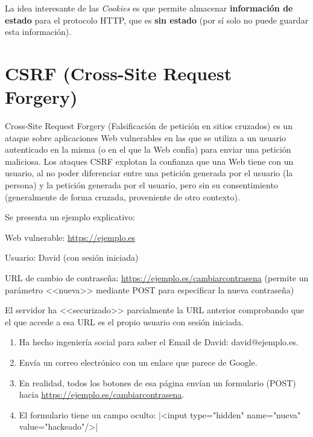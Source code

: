 La idea interesante de las \textit{Cookies} es que permite almacenar
\textbf{información de estado} para el protocolo HTTP, que es \textbf{sin
estado} (por sí solo no puede guardar esta información).

\section{CSRF (Cross-Site Request Forgery)}
Cross-Site Request Forgery (Falsificación de petición en sitios cruzados) es un
ataque sobre aplicaciones Web vulnerables en las que se utiliza a un usuario
autenticado en la misma (o en el que la Web confía) para enviar una petición
maliciosa. Los ataques CSRF explotan la confianza que una Web tiene con un
usuario, al no poder diferenciar entre una petición generada por el usuario (la
persona) y la petición generada por el usuario, pero sin su consentimiento
\cite{csrf} (generalmente de forma cruzada, proveniente de otro contexto).

Se presenta un ejemplo explicativo:

\begin{tcolorbox}[colback=cyan!5!white,colframe=cyan!75!black,title=Situación]
Web vulnerable: \url{https://ejemplo.es}

Usuario: David (con sesión iniciada)

URL de cambio de contraseña: \url{https://ejemplo.es/cambiarcontrasena} (permite
un parámetro <<nueva>> mediante POST para especificar la nueva contraseña)

El servidor ha <<securizado>> parcialmente la URL anterior comprobando que el
que accede a esa URL es el propio usuario con sesión iniciada.
\end{tcolorbox}


\begin{tcolorbox}[colback=red!5!white,colframe=red!75!black,title=Atacante]
    \begin{enumerate}
        \item Ha hecho ingeniería social para saber el Email de David: david@ejemplo.es.
        \item Envía un correo electrónico con un enlace que parece de Google.
        \item En realidad, todos los botones de esa página envían un formulario (POST)
        hacia \url{https://ejemplo.es/cambiarcontrasena}.
        \item El formulario tiene un campo oculto:
        |<input type="hidden" name="nueva" value="hackeado"/>|
    \end{enumerate}
\end{tcolorbox}


